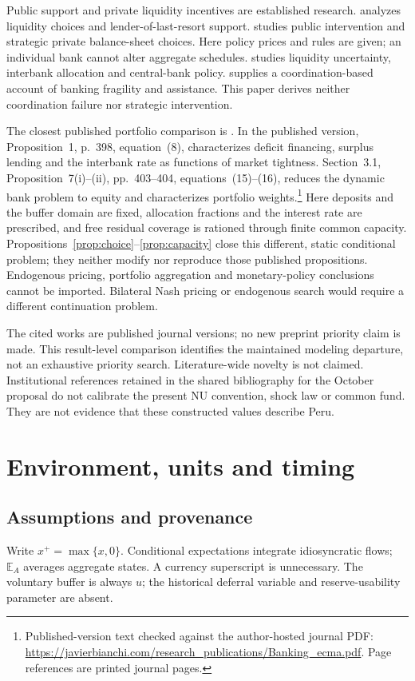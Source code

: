 \documentclass[11pt]{article}
\theoremstyle{definition}
\newcommand{\E}{\mathbb E}
\begin{document}
Public support and private liquidity incentives are established research. \citet{ratnovski2009} analyzes liquidity choices and lender-of-last-resort support. \citet{farhi2012} studies public intervention and strategic private balance-sheet choices. Here policy prices and rules are given; an individual bank cannot alter aggregate schedules. \citet{freixas2011} studies liquidity uncertainty, interbank allocation and central-bank policy. \citet{rochet2004} supplies a coordination-based account of banking fragility and assistance. This paper derives neither coordination failure nor strategic intervention.

The closest published portfolio comparison is \citet{bianchi2022}. In the published version, Proposition~1, p.~398, equation~(8), characterizes deficit financing, surplus lending and the interbank rate as functions of market tightness. Section~3.1, Proposition~7(i)--(ii), pp.~403--404, equations~(15)--(16), reduces the dynamic bank problem to equity and characterizes portfolio weights.\footnote{Published-version text checked against the author-hosted journal PDF: \url{https://javierbianchi.com/research_publications/Banking_ecma.pdf}. Page references are printed journal pages.} Here deposits and the buffer domain are fixed, allocation fractions and the interest rate are prescribed, and free residual coverage is rationed through finite common capacity. Propositions~\ref{prop:choice}--\ref{prop:capacity} close this different, static conditional problem; they neither modify nor reproduce those published propositions. Endogenous pricing, portfolio aggregation and monetary-policy conclusions cannot be imported. Bilateral Nash pricing or endogenous search would require a different continuation problem.

The cited works are published journal versions; no new preprint priority claim is made. This result-level comparison identifies the maintained modeling departure, not an exhaustive priority search. Literature-wide novelty is not claimed. Institutional references retained in the shared bibliography for the October proposal do not calibrate the present NU convention, shock law or common fund. They are not evidence that these constructed values describe Peru.

\section{Environment, units and timing}
\subsection{Assumptions and provenance}
Write $x^+=\max\{x,0\}$. Conditional expectations integrate idiosyncratic flows; $\E_A$ averages aggregate states. A currency superscript is unnecessary. The voluntary buffer is always $u$; the historical deferral variable and reserve-usability parameter are absent.
\end{document}
